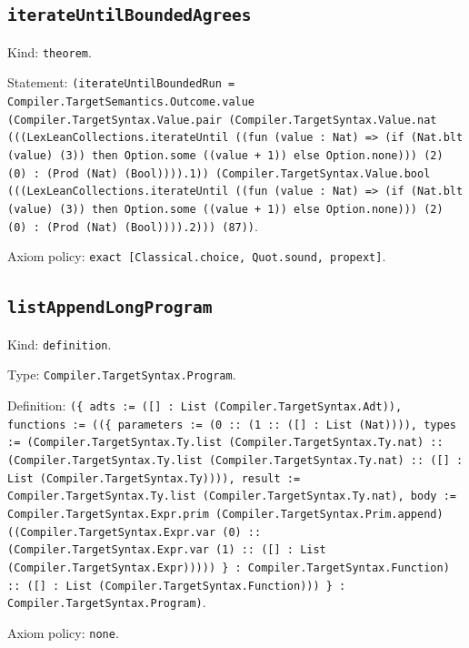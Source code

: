 \documentclass[11pt]{article}
\begin{document}
\subsection*{\texttt{iterateUntilBoundedAgrees}}
\noindent Kind: \texttt{theorem}.\par
\noindent Statement: \texttt{(iterateUntilBoundedRun = Compiler.TargetSemantics.Outcome.value (Compiler.TargetSyntax.Value.pair (Compiler.TargetSyntax.Value.nat (((LexLeanCollections.iterateUntil ((fun (value : Nat) => (if (Nat.blt (value) (3)) then Option.some ((value + 1)) else Option.none))) (2) (0) : (Prod (Nat) (Bool)))).1)) (Compiler.TargetSyntax.Value.bool (((LexLeanCollections.iterateUntil ((fun (value : Nat) => (if (Nat.blt (value) (3)) then Option.some ((value + 1)) else Option.none))) (2) (0) : (Prod (Nat) (Bool)))).2))) (87))}.\par
\noindent Axiom policy: \texttt{exact [Classical.choice, Quot.sound, propext]}.\par
\subsection*{\texttt{listAppendLongProgram}}
\noindent Kind: \texttt{definition}.\par
\noindent Type: \texttt{Compiler.TargetSyntax.Program}.\par
\noindent Definition: \texttt{(\{ adts := ([] : List (Compiler.TargetSyntax.Adt)), functions := ((\{ parameters := (0 :: (1 :: ([] : List (Nat)))), types := (Compiler.TargetSyntax.Ty.list (Compiler.TargetSyntax.Ty.nat) :: (Compiler.TargetSyntax.Ty.list (Compiler.TargetSyntax.Ty.nat) :: ([] : List (Compiler.TargetSyntax.Ty)))), result := Compiler.TargetSyntax.Ty.list (Compiler.TargetSyntax.Ty.nat), body := Compiler.TargetSyntax.Expr.prim (Compiler.TargetSyntax.Prim.append) ((Compiler.TargetSyntax.Expr.var (0) :: (Compiler.TargetSyntax.Expr.var (1) :: ([] : List (Compiler.TargetSyntax.Expr))))) \} : Compiler.TargetSyntax.Function) :: ([] : List (Compiler.TargetSyntax.Function))) \} : Compiler.TargetSyntax.Program)}.\par
\noindent Axiom policy: \texttt{none}.\par
\end{document}
